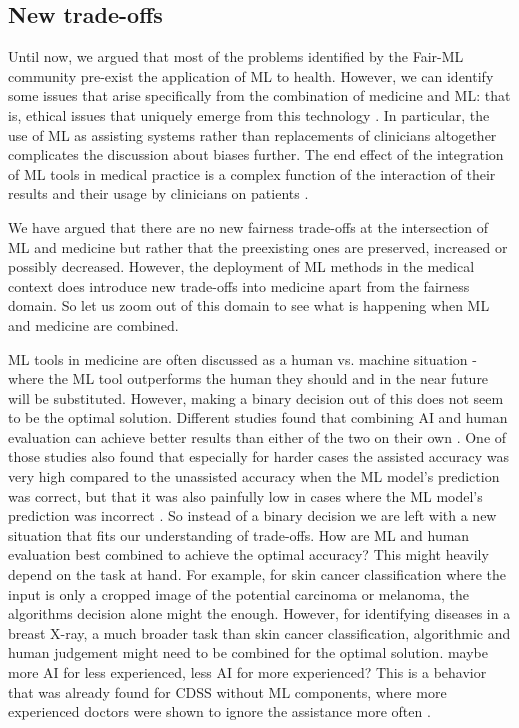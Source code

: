\subsection{New trade-offs}
    Until now, we argued that most of the problems identified by the Fair-ML community pre-exist the application of ML to health.
    However, we can identify some issues that arise specifically from the combination of medicine and ML: that is, ethical issues that uniquely emerge from this technology \cite{Dijkstra2020}.
    In particular, the use of ML as assisting systems rather than replacements of clinicians altogether complicates the discussion about biases further.
    The end effect of the integration of ML tools in medical practice is a complex function of the interaction of their results and their usage by clinicians on patients \cite[p.~4]{Rajkomar2018}.


We have argued that there are no new fairness trade-offs at the intersection of ML and medicine but rather that the preexisting ones are preserved, increased or possibly decreased. However, the deployment of ML methods in the medical context does introduce new trade-offs into medicine apart from the fairness domain. So let us zoom out of this domain to see what is happening when ML and medicine are combined. 

ML tools in medicine are often discussed as a human vs. machine situation - where the ML tool outperforms the human they should and in the near future will be substituted. However, making a binary decision out of this does not seem to be the optimal solution. Different studies found that combining AI and human evaluation can achieve better results than either of the two on their own \cite{rajpurkar2022ai, kiani2020impact, topol2019high, steiner2018impact}. One of those studies also found that especially for harder cases the assisted accuracy was very high compared to the unassisted accuracy when the ML model's prediction was correct, but that it was also painfully low in cases where the ML model's prediction was incorrect \cite{kiani2020impact}. So instead of a binary decision we are left with a new situation that fits our understanding of trade-offs. How are ML and human evaluation best combined to achieve the optimal accuracy? This might heavily depend on the task at hand. For example, for skin cancer classification where the input is only a cropped image of the potential carcinoma or melanoma, the algorithms decision alone might the enough. However, for identifying diseases in a breast X-ray, a much broader task than skin cancer classification, algorithmic and human judgement might need to be combined for the optimal solution.
 maybe more AI for less experienced, less AI for more experienced? This is a behavior that was already found for CDSS without ML components, where more experienced doctors were shown to ignore the assistance more often \cite{sutton2020overview}.


